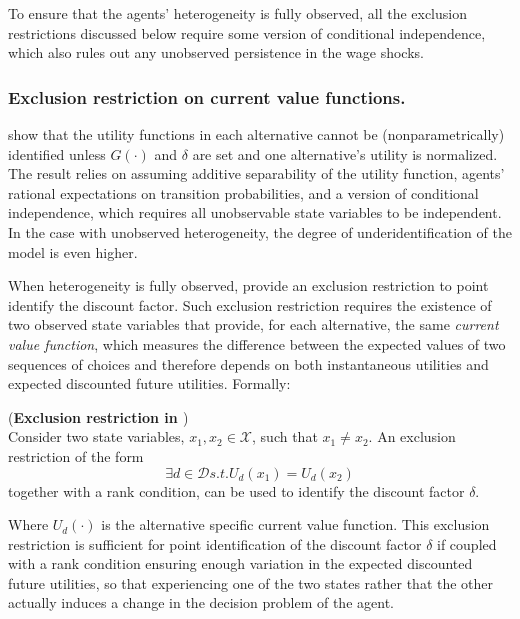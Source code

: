 To ensure that the agents' heterogeneity is fully observed, all the exclusion restrictions discussed below require some version of \textcite{Rust1994} conditional independence, which also rules out any unobserved persistence in the wage shocks. 

\subsubsection{Exclusion restriction on current value functions.}

\textcite{MagnacThesmar2002} show that the utility functions in each alternative cannot be (nonparametrically) identified unless $G(\cdot)$ and $\delta$ are set and one alternative's utility is normalized. The result relies on assuming additive separability of the utility function, agents' rational expectations on transition probabilities, and a version of \textcite{Rust1994} conditional independence, which requires all unobservable state variables to be independent. In the case with unobserved heterogeneity, the degree of underidentification of the model is even higher.

When heterogeneity is fully observed, \textcite{MagnacThesmar2002} provide an exclusion restriction to point identify the discount factor. Such exclusion restriction requires the existence of two observed state variables that provide, for each alternative, the same \textit{current value function}, which measures the difference between the expected values of two sequences of choices and therefore depends on both instantaneous utilities and expected discounted future utilities. Formally:

\medskip
\begin{proposition} (\textbf{Exclusion restriction in \cite{MagnacThesmar2002}}) \label{def:res-magnac} \\
Consider two state variables, $x_1, x_2 \in \mathcal{X}$, such that $x_1 \neq x_2$. An exclusion restriction of the form
\begin{equation*}
\exists d \in \mathcal{D} s.t. U_{d}(x_1) = U_{d}(x_2) 
\end{equation*}
together with a rank condition, can be used to identify the discount factor $\delta$.
\end{proposition}
\medskip

Where $U_d(\cdot)$ is the alternative specific current value function.
This exclusion restriction is sufficient for point identification of the discount factor $\delta$ if coupled with a rank condition ensuring enough variation in the expected discounted future utilities, so that experiencing one of the two states rather that the other actually induces a change in the decision problem of the agent. 

